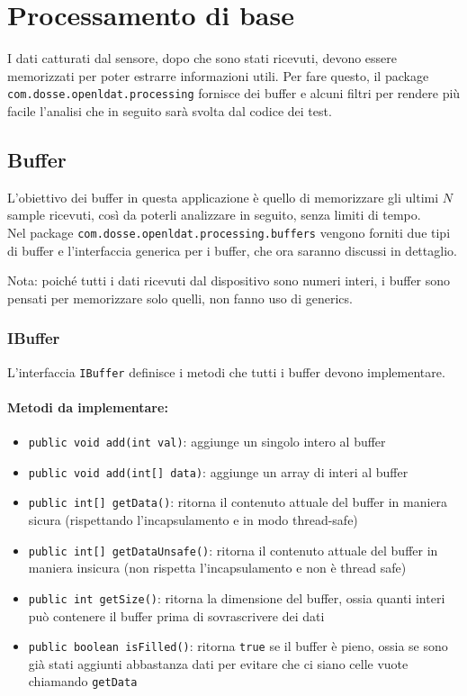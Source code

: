 \section{Processamento di base}
I dati catturati dal sensore, dopo che sono stati ricevuti, devono essere memorizzati per poter estrarre informazioni utili. Per fare questo, il package \texttt{com.dosse.openldat.processing} fornisce dei buffer e alcuni filtri per rendere più facile l'analisi che in seguito sarà svolta dal codice dei test.

\subsection{Buffer}
L'obiettivo dei buffer in questa applicazione è quello di memorizzare gli ultimi $N$ sample ricevuti, così da poterli analizzare in seguito, senza limiti di tempo.\\
Nel package \texttt{com.dosse.openldat.processing.buffers} vengono forniti due tipi di buffer e l'interfaccia generica per i buffer, che ora saranno discussi in dettaglio.

Nota: poiché tutti i dati ricevuti dal dispositivo sono numeri interi, i buffer sono pensati per memorizzare solo quelli, non fanno uso di generics.

\subsubsection{IBuffer}
L'interfaccia \texttt{IBuffer} definisce i metodi che tutti i buffer devono implementare.

\paragraph{Metodi da implementare:}\begin{itemize}
	\item \texttt{public void add(int val)}: aggiunge un singolo intero al buffer
	\item \texttt{public void add(int[] data)}: aggiunge un array di interi al buffer
	\item \texttt{public int[] getData()}: ritorna il contenuto attuale del buffer in maniera sicura (rispettando l'incapsulamento e in modo thread-safe)
	\item \texttt{public int[] getDataUnsafe()}: ritorna il contenuto attuale del buffer in maniera insicura (non rispetta l'incapsulamento e non è thread safe)
	\item \texttt{public int getSize()}: ritorna la dimensione del buffer, ossia quanti interi può contenere il buffer prima di sovrascrivere dei dati
	\item \texttt{public boolean isFilled()}: ritorna \texttt{true} se il buffer è pieno, ossia se sono già stati aggiunti abbastanza dati per evitare che ci siano celle vuote chiamando \texttt{getData}
\end{itemize}

